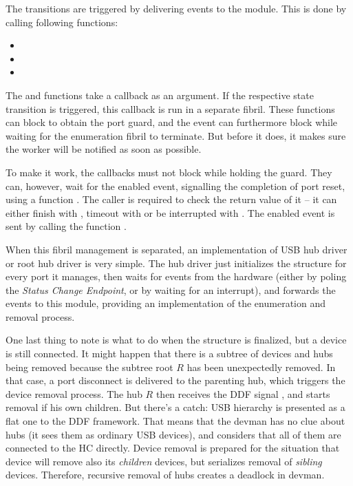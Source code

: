 The transitions are triggered by delivering events to the module. This is done
by calling following functions:

\begin{itemize}
	\item {}
	\item {}
	\item {}
\end{itemize}

The  and  functions take a callback as an
argument. If the respective state transition is triggered, this callback is run
in a separate fibril. These functions can block to obtain the port guard, and
the  event can furthermore block while waiting for the
enumeration fibril to terminate. But before it does, it makes sure the worker
will be notified as soon as possible.

To make it work, the callbacks must not block while holding the guard. They
can, however, wait for the enabled event, signalling the completion of port
reset, using a function . The caller is required
to check the return value of it -- it can either finish with ,
timeout with  or be interrupted with . The enabled
event is sent by calling the function .

When this fibril management is separated, an implementation of USB hub driver or
root hub driver is very simple. The hub driver just initializes the
 structure for every port it manages, then waits for events
from the hardware (either by poling the \textit{Status Change Endpoint}, or by
waiting for an interrupt), and forwards the events to this module, providing an
implementation of the enumeration and removal process.

One last thing to note is what to do when the structure is finalized, but
a device is still connected. It might happen that there is a subtree of devices
and hubs being removed because the subtree root $R$ has been unexpectedly
removed. In that case, a port disconnect is delivered to the parenting hub,
which triggers the device removal process. The hub $R$ then receives the DDF
signal , and starts removal if his own children. But
there's a catch: USB hierarchy is presented as a flat one to the DDF framework.
That means that the devman has no clue about hubs (it sees them as ordinary USB
devices), and considers that all of them are connected to the HC directly.
Device removal is prepared for the situation that device will remove also its
\textit{children} devices, but serializes removal of \textit{sibling} devices.
Therefore, recursive removal of hubs creates a deadlock in devman.

